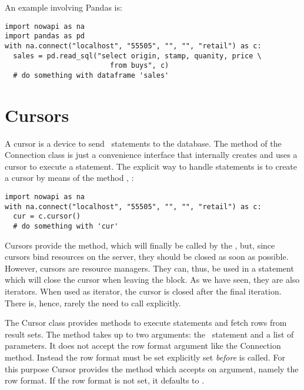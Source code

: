 An example involving Pandas is:

\begin{python}
\begin{lstlisting}
import nowapi as na
import pandas as pd
with na.connect("localhost", "55505", "", "", "retail") as c:
  sales = pd.read_sql("select origin, stamp, quanity, price \
                         from buys", c)
  # do something with dataframe 'sales'
\end{lstlisting}
\end{python}

\section{Cursors}
A cursor is a device to send \sql\ statements to the database.
The  method of the Connection class is just a
convenience interface that internally creates and uses a
cursor to execute a statement. The explicit way to handle statements
is to create a cursor by means of the method \term{cursor}, \eg:

\begin{python}
\begin{lstlisting}
import nowapi as na
with na.connect("localhost", "55505", "", "", "retail") as c:
  cur = c.cursor()
  # do something with 'cur'
\end{lstlisting}
\end{python}

Cursors provide the  method, which
will finally be called by the ,
but, since cursors bind resources on the server,
they should be closed
as soon as possible.
However, cursors are resource managers.
They can, thus, be used in a  statement
which will close the cursor when leaving the block.
As we have seen, they are also iterators.
When used as iterator, the cursor is closed
after the final iteration.
There is, hence, rarely the need to call 
explicitly.

The Cursor class provides methods to
execute statements and fetch rows from result sets.
The  method takes up to two arguments:
the \sql\ statement and a list of parameters.
It does not accept the row format argument like
the Connection method. Instead the row format
must be set explicitly set \emph{before} 
is called. For this purpose Cursor provides the
method  which accepts on argument,
namely the row format. If the row format is not set,
it defaults to .

